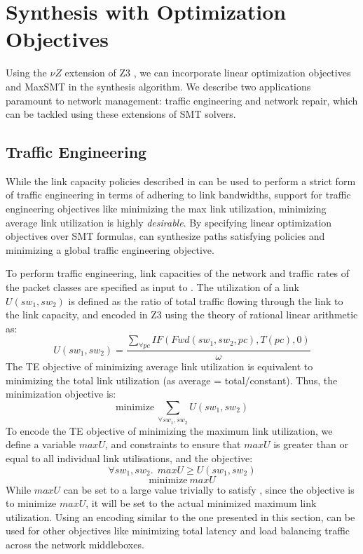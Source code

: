 \section{Synthesis with Optimization Objectives}
Using the $\nu Z$ extension of Z3 \cite{nuz3}, we can incorporate 
linear optimization
objectives and MaxSMT in the synthesis algorithm. 
We describe two applications paramount to network management:
traffic engineering and network repair, which can be tackled using
these extensions of SMT solvers.
\subsection{Traffic Engineering}
While the link capacity policies described in  can
be used to perform a strict form of traffic engineering in terms of 
adhering to link bandwidths, support for traffic engineering objectives
like minimizing the max link utilization, minimizing average link utilization
is highly \emph{desirable}. By specifying linear optimization objectives over
SMT formulas, \name can synthesize paths satisfying policies and minimizing
a global traffic engineering objective. 

To perform traffic engineering, link capacities of the network and traffic 
rates of the packet classes are specified as input to \name. The utilization 
of a link $U(sw_1, sw_2)$ is defined as the ratio of total traffic flowing through the link to the 
link capacity, and encoded in Z3 using the theory of rational linear arithmetic as:
\begin{equation}
U(sw_1, sw_2) = \frac{\sum_{\forall pc} IF(Fwd(sw_1,sw_2, pc), T(pc), 0)} {\omega}
\end{equation}
The TE objective of minimizing average link utilization is equivalent to minimizing
the total link utilization (as average = total/constant). Thus, the minimization
objective is:
\begin{equation}
	\text{minimize}\ \sum_{\forall sw_1, sw_2} U(sw_1, sw_2)
\end{equation}
To encode the TE objective of minimizing the maximum link utilization, we define
a variable $maxU$, and constraints to ensure that $maxU$ is greater than or equal to all 
individual link utilisations, and the objective: 
\begin{equation} \label{eq:maxu}
\forall sw_1, sw_2.\ \ maxU \geq U(sw_1, sw_2)
\end{equation} 
\begin{equation}
		\text{minimize}\ maxU
\end{equation}
While $maxU$ can be set to a large value trivially to satisfy 
, since the objective is to minimize $maxU$, it will be set to the actual
minimized maximum link utilization. Using an encoding similar to the one presented in this section, \name can be used for other objectives like minimizing total latency and load balancing
traffic across the network middleboxes.


